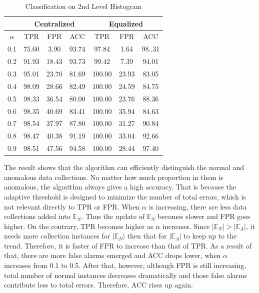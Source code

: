 \documentclass[10pt,conference,letterpaper]{IEEEtran}
\begin{document}
			\begin{table}[!ht]
				\centering
				\caption{Classification on 2nd Level Histogram}
				\label{tab:syn-result-2nd}
				\begin{tabular}{|c|c|c|c|c|c|c|}
					\hline
					& \multicolumn{3}{c|}{Centralized} & \multicolumn{3}{c|}{Equalized}\\
					\hline
					$\alpha$ & TPR & FPR & ACC & TPR & FPR & ACC \\ 
					\hline
					0.1 & 75.60 & 3.90 & 93.74 & 97.84 & 1.64 & 98..31 \\ 
					\hline
					0.2 & 91.93 & 18.43 & 93.73 & 99.42 & 7.39 & 94.01 \\ 
					\hline
					0.3 & 95.01 & 23.70 & 81.69 & 100.00 & 23.93 & 83.05 \\ 
					\hline
					0.4 & 98.09 & 28.66 & 82.49 & 100.00 & 24.59 & 84.75 \\ 
					\hline
					0.5 & 98.33 & 36.54 & 80.00 & 100.00 & 23.76 & 88.36 \\ 
					\hline
					0.6 & 98.35 & 40.69 & 83.41 & 100.00 & 35.94 & 84.63 \\ 
					\hline
					0.7 & 98.54 & 37.97 & 87.80 & 100.00 & 31.27 & 90.84 \\ 
					\hline
					0.8 & 98.47 & 40.38 & 91.19 & 100.00 & 33.04 & 92.66 \\ 
					\hline
					0.9 & 98.51 & 47.56 & 94.58 & 100.00 & 28.44 & 97.40\\
					\hline
				\end{tabular} 
			\end{table}
			
			The result shows that the algorithm can efficiently distinguish the normal and anomalous data collections. No matter how much proportion in them is anomalous, the algorithm always gives a high accuracy. That is because the adaptive threshold is designed to minimize the number of total errors, which is not relevant directly to TPR or FPR. When $\alpha$ is increasing, there are less data collections added into $\mathbb{E}_N$. Thus the update of $\mathbb{E}_N$ becomes slower and FPR goes higher. On the contrary, TPR becomes higher as $\alpha$ increases. Since $|\mathbb{E}_N| > |\mathbb{E}_A|$, it needs more collection instances for $|\mathbb{E}_N|$ then that for $|\mathbb{E}_A|$ to keep up to the trend. Therefore, it is faster of FPR to increase than that of TPR. As a result of that, there are more false alarms emerged and ACC drops lower, when $\alpha$ increases from 0.1 to 0.5. After that, however, although FPR is still increasing, total number of normal instances decreases dramatically and those false alarms contribute less to total errors. Therefore, ACC rises up again. 
	
\end{document}
